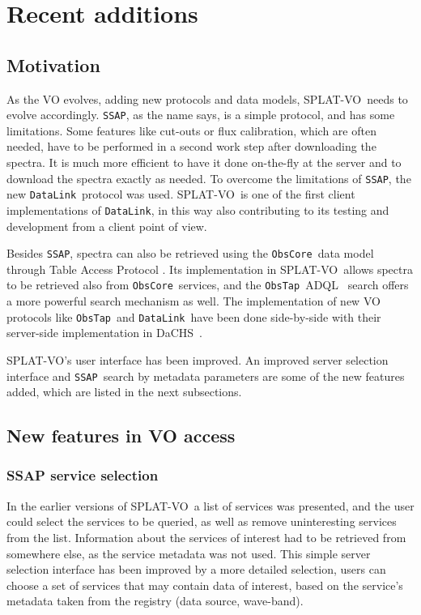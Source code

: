 \documentclass[final,authoryear,5p,times,twocolumn]{elsarticle}
\newcommand{\datalink}{\texttt{DataLink}}
\newcommand{\ssap}{\texttt{SSAP}}
\newcommand{\obstap}{\texttt{ObsTap}}
\newcommand{\obscore}{\texttt{ObsCore}}
\newcommand{\adql}{ADQL}
\newcommand{\splatvo}{{\textsf{\small{SPLAT-VO}}}}
\newcommand{\dachs}{\textsf{\small DaCHS}}
\begin{document}
\section{Recent additions}

\subsection{Motivation}

As the VO evolves, adding new protocols and data models, \splatvo\ needs to
evolve accordingly.  \ssap, as the name says, is a simple protocol, and has
some limitations. Some features like cut-outs or flux calibration, which are
often needed, have to be performed in a second work step after downloading the
spectra. It is much more efficient to have it done on-the-fly at the server and
to download the spectra exactly as needed. To overcome the limitations of
\ssap, the new \datalink\ protocol \citep{datalink} was used. \splatvo\ is one
of the first client implementations of \datalink, in this way also contributing
to its testing and development from a client point of view.

Besides \ssap, spectra can also be retrieved using the \obscore\ data model
through Table Access Protocol  \citep[known as \obstap;][]{obstap}. Its
implementation in \splatvo\ allows spectra to be retrieved also from \obscore\
services, and the \obstap\ \adql\ \citep{adql} search offers a more powerful
search mechanism as well. The implementation of new VO protocols like \obstap\
and \datalink\ have been done side-by-side with their server-side
implementation in \dachs\ \citep[Data Center Helper Suite;][]{dachs}.

\splatvo's user interface has been improved. An improved server selection
interface and \ssap\ search by metadata parameters are some of the new features
added, which are listed in the next subsections.

\subsection{New features in VO access}

\subsubsection{SSAP service selection}

In the earlier versions of \splatvo\ a list of services was presented, and the
user could select the services to be queried, as well as remove uninteresting
services from the list. Information about the services of interest had to be
retrieved from somewhere else, as the service metadata was not used.  This
simple server selection interface has been improved by a more detailed
selection, users can choose a set of services that may contain data of
interest, based on the service's metadata taken from the registry (data source,
wave-band).
\end{document}
